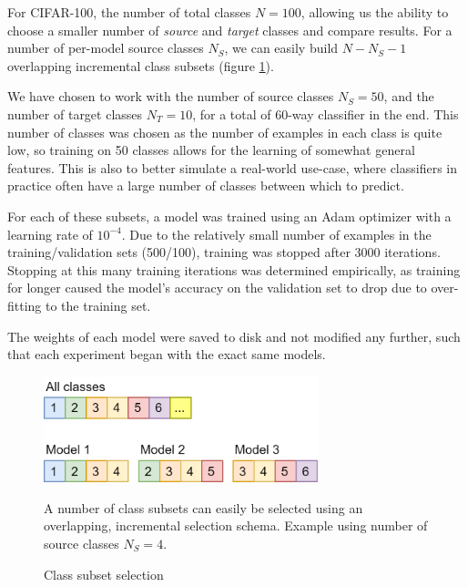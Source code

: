 \documentclass{report}
\begin{document}
	For CIFAR-100, the number of total classes $N=100$, allowing us the ability to choose a smaller number of \emph{source} and \emph{target} classes and compare results. For a number of per-model source classes $N_S$, we can easily build $N-N_S-1$ overlapping incremental class subsets (figure \ref{fig:subsets:1}). \par
	We have chosen to work with the number of source classes $N_S = 50$, and the number of target classes $N_T = 10$, for a total of 60-way classifier in the end. This number of classes was chosen as the number of examples in each class is quite low, so training on 50 classes allows for the learning of somewhat general features. This is also to better simulate a real-world use-case, where classifiers in practice often have a large number of classes between which to predict. \par
	For each of these subsets, a model was trained using an Adam optimizer with a learning rate of $10^{-4}$. Due to the relatively small number of examples in the training/validation sets (500/100), training was stopped after 3000 iterations. Stopping at this many training iterations was determined empirically, as training for longer caused the model's accuracy on the validation set to drop due to over-fitting to the training set. \par
	The weights of each model were saved to disk and not modified any further, such that each experiment began with the exact same models. \par
	\begin{figure}[h]
		\centering
		\includegraphics[width=8cm]{modelsubsets}
		\caption{Class subset selection}
		A number of class subsets can easily be selected using an overlapping, incremental selection schema. Example using number of source classes $N_S = 4$.
		\label{fig:subsets:1}
	\end{figure}
\end{document}
